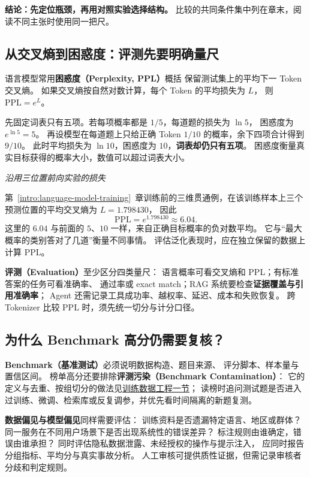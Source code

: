 \textbf{结论：先定位瓶颈，再用对照实验选择结构。}
比较的共同条件集中列在章末，阅读不同主张时使用同一把尺。

\subsection{从交叉熵到困惑度：评测先要明确量尺}
\label{concept:perplexity}

语言模型常用\textbf{困惑度（Perplexity, PPL）}概括
保留测试集上的平均下一 Token 交叉熵。
如果交叉熵按自然对数计算，每个 Token 的平均损失为 $L$，
则 $\mathrm{PPL}=e^L$。

先固定词表只有五项。若每项概率都是 $1/5$，每道题的损失为 $\ln5$，
困惑度为 $e^{\ln5}=5$。
再设模型在每道题上只给正确 Token $1/10$ 的概率，余下四项合计得到 $9/10$。
此时平均损失为 $\ln10$，困惑度为 $10$，\textbf{词表却仍只有五项}。
困惑度衡量真实目标获得的概率大小，数值可以超过词表大小。

\begin{example}[breakable=false]
\noindent\emph{沿用三位置前向实验的损失}\par
第~\ref*{intro:language-model-training}~章训练前的三维贯通例，在该训练样本上三个预测位置的平均交叉熵为 $L=1.798430$，
因此
\[
\mathrm{PPL}=e^{1.798430}\approx 6.04.
\]
这里的 $6.04$ 与前面的 $5$、$10$ 一样，来自正确目标概率的负对数平均。
它与“最大概率的类别答对了几道”衡量不同事情。
评估泛化表现时，应在独立保留的数据上计算 PPL。
\end{example}

\textbf{评测（Evaluation）}至少区分四类量尺：
语言概率可看交叉熵和 PPL；有标准答案的任务可看准确率、
通过率或 exact match；RAG 系统要检查\textbf{证据覆盖与引用准确率}；
Agent 还需记录工具成功率、越权率、延迟、成本和失败恢复。
跨 Tokenizer 比较 PPL 时，须先统一切分与计分口径。

\subsection{为什么 Benchmark 高分仍需要复核？}
\label{concept:evaluation-contamination-benchmark}

\textbf{Benchmark（基准测试）}必须说明数据构造、题目来源、
评分脚本、样本量与置信区间。
榜单高分还要排除\textbf{评测污染（Benchmark Contamination）}：
它的定义与去重、按组切分的做法见\hyperref[concept:evaluation-contamination]{训练数据工程一节}；
读榜时追问测试题是否进入过训练、微调、检索库或反复调参，并优先看时间隔离的新题复测。

\textbf{数据偏见与模型偏见}同样需要评估：
训练资料是否遗漏特定语言、地区或群体？
同一服务在不同用户场景下是否出现系统性的错误差异？
标注规则由谁确定，错误由谁承担？
同时评估隐私数据泄露、未经授权的操作与提示注入，
应同时报告分组指标、平均分与真实事故分析。
人工审核可提供质性证据，但需记录审核者分歧和判定规则。

